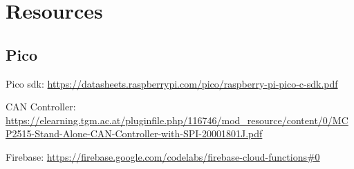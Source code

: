 \section{Resources}
\subsection{Pico}
Pico sdk: \url{https://datasheets.raspberrypi.com/pico/raspberry-pi-pico-c-sdk.pdf}


CAN Controller: \url{https://elearning.tgm.ac.at/pluginfile.php/116746/mod_resource/content/0/MCP2515-Stand-Alone-CAN-Controller-with-SPI-20001801J.pdf}


Firebase: \url{https://firebase.google.com/codelabs/firebase-cloud-functions#0}